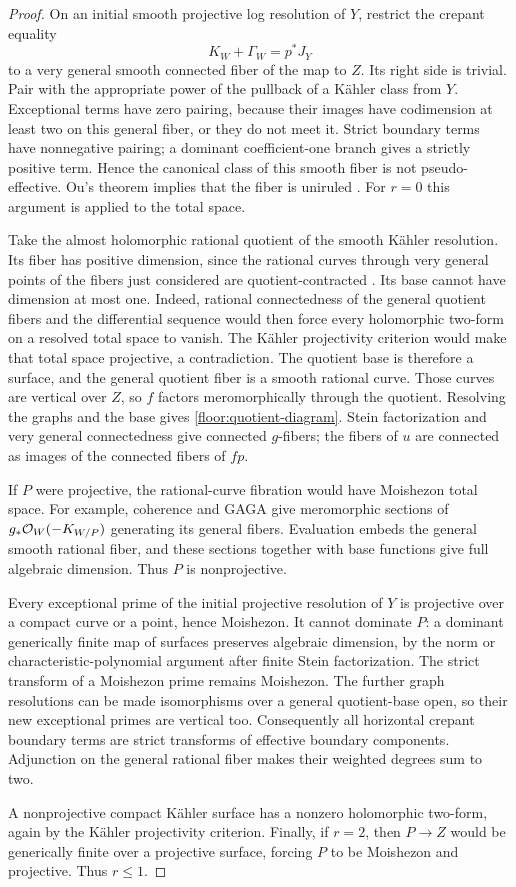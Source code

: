 \begin{proof}
On an initial smooth projective log resolution of $Y$, restrict the
crepant equality
\[
 K_W+\Gamma_W=p^*J_Y
\]
to a very general smooth connected fiber of the map to $Z$.
Its right side is trivial.  Pair with the appropriate power of the
pullback of a K\"ahler class from $Y$.  Exceptional terms have zero
pairing, because their images have codimension at least two on this
general fiber, or they do not meet it.  Strict boundary terms have
nonnegative pairing; a dominant coefficient-one branch gives a
strictly positive term.  Hence the canonical class of this smooth
fiber is not pseudo-effective.  Ou's theorem implies that the
fiber is uniruled \cite{OuUniruledness}.  For $r=0$ this argument is
applied to the total space.

Take the almost holomorphic rational quotient of the smooth
K\"ahler resolution.  Its fiber has positive dimension, since the
rational curves through very general points of the fibers just
considered are quotient-contracted
\cite{CampanaRationalQuotient}.  Its base cannot have dimension
at most one.  Indeed, rational connectedness of the general quotient
fibers and the differential sequence would then force every
holomorphic two-form on a resolved total space to vanish.  The
K\"ahler projectivity criterion would make that total space
projective, a contradiction.  The quotient base is therefore a
surface, and the general quotient fiber is a smooth rational curve.
Those curves are vertical over $Z$, so $f$ factors meromorphically
through the quotient.  Resolving the graphs and the base gives
\eqref{floor:quotient-diagram}.  Stein factorization and very
general connectedness give connected $g$-fibers; the fibers of $u$
are connected as images of the connected fibers of $fp$.

If $P$ were projective, the rational-curve fibration would have
Moishezon total space.  For example, coherence and GAGA give
meromorphic sections of $g_*\mathcal{O}_W(-K_{W/P})$ generating its general
fibers.  Evaluation embeds the general smooth rational fiber, and
these sections together with base functions give full algebraic
dimension.  Thus $P$ is nonprojective.

Every exceptional prime of the initial projective resolution of
$Y$ is projective over a compact curve or a point, hence Moishezon.
It cannot dominate $P$: a dominant generically finite map of
surfaces preserves algebraic dimension, by the norm or
characteristic-polynomial argument after finite Stein
factorization.  The strict transform of a Moishezon prime remains
Moishezon.  The further graph resolutions can be made isomorphisms
over a general quotient-base open, so their new exceptional primes
are vertical too.  Consequently all horizontal crepant boundary
terms are strict transforms of effective boundary components.
Adjunction on the general rational fiber makes their weighted
degrees sum to two.

A nonprojective compact K\"ahler surface has a nonzero holomorphic
two-form, again by the K\"ahler projectivity criterion.  Finally,
if $r=2$, then $P\to Z$ would be generically finite over a
projective surface, forcing $P$ to be Moishezon and projective.
Thus $r\le1$.
\end{proof}

